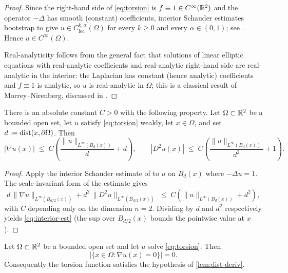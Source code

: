 \begin{proof}
Since the right-hand side of \eqref{eq:torsion} is $f\equiv 1\in C^\infty(\mathbb{R}^2)$
and the operator $-\Delta$ has smooth (constant) coefficients, interior Schauder
estimates bootstrap to give $u\in C^{k,\alpha}_{\mathrm{loc}}(\Omega)$ for
every $k\ge 0$ and every $\alpha\in(0,1)$; see
\cite[Theorem~6.17, Corollary~6.18]{GilbargTrudinger2001}.  Hence
$u\in C^\infty(\Omega)$.

Real-analyticity follows from the general fact that solutions of linear
elliptic equations with real-analytic coefficients and real-analytic right-hand
side are real-analytic in the interior: the Laplacian has constant (hence
analytic) coefficients and $f\equiv 1$ is analytic, so $u$ is real-analytic in
$\Omega$; this is a classical result of Morrey--Nirenberg, discussed in
\cite[Chapter~6, \S6.8 and the historical notes]{GilbargTrudinger2001}.
\end{proof}

\begin{theorem}\label{thm:interior-est}
There is an absolute constant $C>0$ with the following property.  Let
$\Omega\subset\mathbb{R}^2$ be a bounded open set, let $u$ satisfy \eqref{eq:torsion}
weakly, let $x\in\Omega$, and set $d:=\operatorname{dist}(x,\partial\Omega)$.  Then
\begin{equation}\label{eq:interior-est}
  |\nabla u(x)| \;\le\; C\!\left(\frac{\|u\|_{L^\infty(B_d(x))}}{d}+d\right),
  \qquad
  |D^2 u(x)| \;\le\; C\!\left(\frac{\|u\|_{L^\infty(B_d(x))}}{d^2}+1\right).
\end{equation}
\end{theorem}

\begin{proof}
Apply the interior Schauder estimate of \cite[Theorem~6.2]{GilbargTrudinger2001}
to $u$ on $B_d(x)$ where $-\Delta u = 1$.  The scale-invariant form of the
estimate gives
\[
  d\,\|\nabla u\|_{L^\infty(B_{d/2}(x))} + d^2\,\|D^2u\|_{L^\infty(B_{d/2}(x))}
  \;\le\; C\!\left(\|u\|_{L^\infty(B_d(x))} + d^2\right),
\]
with $C$ depending only on the dimension $n=2$.  Dividing by $d$ and $d^2$
respectively yields \eqref{eq:interior-est} (the sup over $B_{d/2}(x)$ bounds
the pointwise value at $x$).
\end{proof}

\begin{lemma}
\label{lem:crit-zero}
Let $\Omega\subset\mathbb{R}^2$ be a bounded open set and let $u$ solve
\eqref{eq:torsion}.  Then
\[
  |\{x\in\Omega:\nabla u(x)=0\}|=0 .
\]
Consequently the torsion function satisfies the hypothesis of
\cref{lem:dist-deriv}.
\end{lemma}

